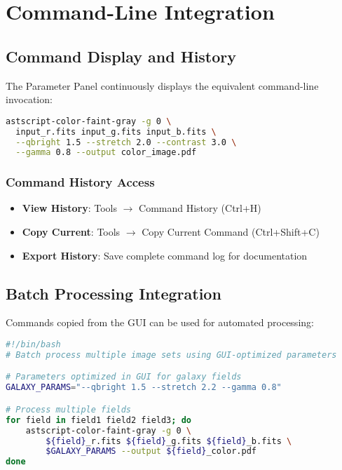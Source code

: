 \documentclass[11pt,a4paper]{article}
\begin{document}
\section{Command-Line Integration}

\subsection{Command Display and History}

The Parameter Panel continuously displays the equivalent command-line
invocation:

\begin{lstlisting}[language=bash]
astscript-color-faint-gray -g 0 \
  input_r.fits input_g.fits input_b.fits \
  --qbright 1.5 --stretch 2.0 --contrast 3.0 \
  --gamma 0.8 --output color_image.pdf
\end{lstlisting}

\subsubsection{Command History Access}

\begin{itemize}[leftmargin=*]
\item \textbf{View History}: Tools $\rightarrow$ Command History (Ctrl+H)
\item \textbf{Copy Current}: Tools $\rightarrow$ Copy Current Command
(Ctrl+Shift+C)
\item \textbf{Export History}: Save complete command log for documentation
\end{itemize}

\subsection{Batch Processing Integration}

Commands copied from the GUI can be used for automated processing:

\begin{lstlisting}[language=bash]
#!/bin/bash
# Batch process multiple image sets using GUI-optimized parameters

# Parameters optimized in GUI for galaxy fields
GALAXY_PARAMS="--qbright 1.5 --stretch 2.2 --gamma 0.8"

# Process multiple fields
for field in field1 field2 field3; do
    astscript-color-faint-gray -g 0 \
        ${field}_r.fits ${field}_g.fits ${field}_b.fits \
        $GALAXY_PARAMS --output ${field}_color.pdf
done
\end{lstlisting}
\end{document}

